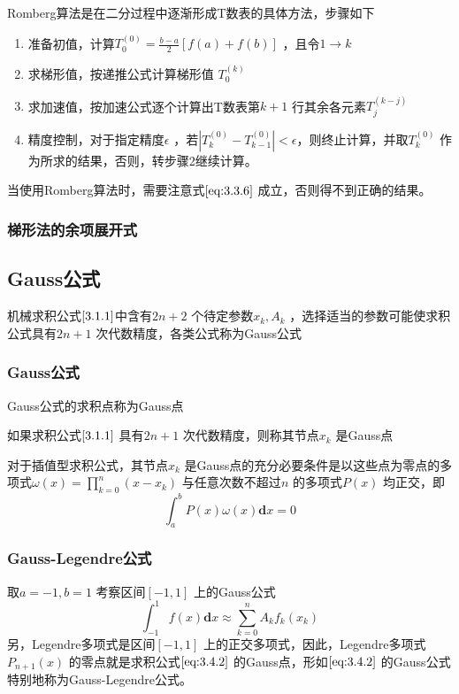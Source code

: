 \documentclass[a4paper]{article}
\begin{document}
Romberg算法是在二分过程中逐渐形成T数表的具体方法，步骤如下
\begin{enumerate}
	\item 准备初值，计算$T_0^{(0)} = \frac{b-a}{2}[f(a) + f(b)]$ ，且令$1 \to k$
	\item 求梯形值，按递推公式计算梯形值 $T_0^{(k)}$ 
	\item 求加速值，按加速公式逐个计算出T数表第$k+1$ 行其余各元素$T_j^{(k-j)}$ 
	\item 精度控制，对于指定精度$\epsilon$ ，若$| T_k^{(0)} - T_{k-1}^{(0)} | < \epsilon$，则终止计算，并取$T_k^{(0)}$ 作为所求的结果，否则，转步骤2继续计算。
\end{enumerate}

当使用Romberg算法时，需要注意式$\ref{eq:3.3.6}$ 成立，否则得不到正确的结果。

\subsubsection{梯形法的余项展开式}
\subsection{Gauss公式}
机械求积公式$\ref{3.1.1}$中含有$2n + 2$ 个待定参数$x_k, A_k$ ，选择适当的参数可能使求积公式具有$2n + 1$ 次代数精度，各类公式称为Gauss公式
\subsubsection{Gauss公式}
Gauss公式的求积点称为Gauss点
\begin{definition}
	如果求积公式$\ref{3.1.1}$ 具有$2n+1$ 次代数精度，则称其节点$x_k$ 是Gauss点
\end{definition}

\begin{theorem}
	对于插值型求积公式，其节点$x_{k}$ 是Gauss点的充分必要条件是以这些点为零点的多项式$\omega (x) = \prod_{k=0}^{n} (x-x_{k}) $ 与任意次数不超过$n$ 的多项式$P(x)$ 均正交，即
	\[
		\int_{a}^{b} P(x) \omega (x) \mathbf{d} x = 0 \tag{3.4.1} \label{eq:3.4.1}
	\] 
\end{theorem}

\subsubsection{Gauss-Legendre公式}
取$a = -1, b = 1$ 考察区间$[-1,1]$ 上的Gauss公式
\[
	\int_{-1}^{1} f(x) \mathbf{d} x \approx \sum_{k=0}^{n} A_k f_k(x_{k}) \tag{3.4.2} \label{eq:3.4.2}
\] 
另，Legendre多项式是区间$[-1,1]$ 上的正交多项式，因此，Legendre多项式$P_{n+1}(x)$ 的零点就是求积公式$\ref{eq:3.4.2}$ 的Gauss点，形如$\ref{eq:3.4.2}$ 的Gauss公式特别地称为Gauss-Legendre公式。
\end{document}
